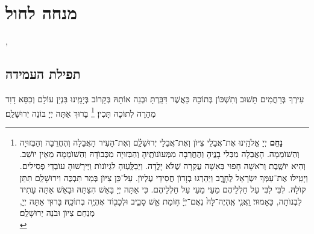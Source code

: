 \documentclass[twoside, openany, parskip=half, 11pt]{book}
\begin{document}
\vfill
\sepline

\chapter[מנחה לחול]{ מנחה לחול }
\tamid

\ketoret
\sepline
\ashrei

\halfkaddish

,

\section*{ תפילת העמידה }


\amidaopening{\ayt}{}

\weekdaysakedusha \vspace{0.5\baselineskip}

\sepline

\weekdaysabinah

\weekdaysateshuva

\weekdaysaselichah

\weekdaysageulah

\weekdaysaanneinu

\weekdaysarefuah

\weekdaysaberacha

\weekdaysashofar

\weekdaysamishpat

\weekdaysaminim

\weekdaysatzadikim

עִירְךָ בְּרַחֲמִים תָּשׁוּב וְתִשְׁכּוֹן בְּתוֹכָהּ כַּאֲשֶׁר דִּבַּֽרְתָּ וּבְנֵה אוֹתָהּ בְּקָרוֹב בְּיָמֵֽינוּ בִּנְיַן עוֹלָם וְכִסֵּא דָוִד מְהֵרָה לְתוֹכָהּ תָּכִין׃
\footnote{
\textbf{נַחֵם}
יְיָ אֱלֹהֵֽינוּ אֶת־אֲבֵלֵי צִיּוֺן וְאֶת־אֲבֵלֵי יְרוּשָׁלַֽ֔֗͏ִם וְאֶת־הָעִיר הָאֲבֵלָה וְהֶחֳרֵבָה וְהַבְּזוּיָה וְהַשׁוֺמֵמָה. הָאֲבֵלָה מִבְּלִי בָנֱיהָ וְהֶחֳרֵבָה מִמְּעוֺנוֺתֶֽיהָ וְהַבְּזוּיָה מִכְּבוֺדָהּ וְהַשׁוֺמֵמָה מֵאֵין יוֺשֵׁב. וְהִיא יוֺשֶֽׁבֶת וְרֹאשָׁה חָפוּי בְּאִשָׁה עֲקַרָה שֶׁלֹּא יָלֳדָה. וַיְבַלְְּעֽוּהָ לִגְיוֺנוֺת וַיְּירָשׁוּהָ עוֺבְדֵי פְסִילִים. וַיָטִֽילוּ אֶת־עַמְּךָ יִשְׂרָאֵל לֶחָרֱֽב וַיַּהַרְגוּ בְזָדוֺן חֲסִידֵי עֶלְיוֺן. עַל־כֵּן צִיּוֺן בְּמַר תִּבְכֶּה וִירוּשָׁלַֽ͏ִם תִּתֵּן קוֺלָהּ. לִבִּי לִבִּי עַל חַלְלֵיהֶם מֵעַי מֵעַי עַל חַלְלֵיהֶם. כִּי אַתָּה יְיָ בָּאֵשׁ הִצַּתָּהּ וּבָאֵשׁ אַתָּה עָתִיד לִבְנוֺתָה, כָּאָמוּר׃ וַֽאֲנִ֤י אֶֽהְיֶה־לָּהּ֙ נְאֻם־יְיָ֔ ח֥וֹמַת אֵ֖שׁ סָבִ֑יב וּלְכָב֖וֹד אֶהְיֶ֥ה בְתוֹכָֽהּ׃
בָּרוּךְ אַתָּה יְיָ, מְנַחֵם צִיוֺן וּבֹנֵה יְרוּשָׁלַֽ͏ִם׃ \\
}
בָּרוּךְ אַתָּה יְיָ בּוֹנֵה יְרוּשָׁלַ‍ִם׃
\end{document}
